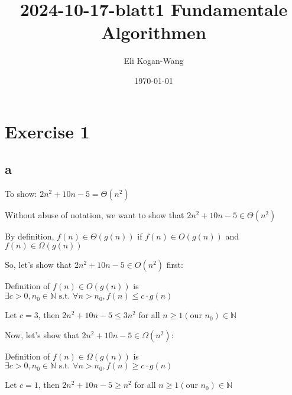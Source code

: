 \documentclass[a4paper,12pt]{article}
\title{2024-10-17-blatt1 Fundamentale Algorithmen}
\author{Eli Kogan-Wang}
\date{\today}
\begin{document}

\section{Exercise 1}

\subsection{a}

To show: $2n^2 + 10n - 5 = \Theta(n^2)$

Without abuse of notation, we want to show that $2n^2 + 10n - 5 \in \Theta(n^2)$

By definition, $f(n) \in \Theta(g(n))$ if $f(n) \in O(g(n))$ and $f(n) \in \Omega(g(n))$

So, let's show that $2n^2 + 10n - 5 \in O(n^2)$ first:

Definition of $f(n) \in O(g(n))$ is $\exists c > 0, n_0 \in \mathbb{N} \text{ s.t. } \forall n > n_0, f(n) \leq c \cdot g(n)$

Let $c = 3$, then $2n^2 + 10n - 5 \leq 3n^2$ for all $n \geq 1 (\text{our } n_0)\in \mathbb{N}$

Now, let's show that $2n^2 + 10n - 5 \in \Omega(n^2)$:

Definition of $f(n) \in \Omega(g(n))$ is $\exists c > 0, n_0 \in \mathbb{N} \text{ s.t. } \forall n > n_0, f(n) \geq c \cdot g(n)$

Let $c = 1$, then $2n^2 + 10n - 5 \geq n^2$ for all $n \geq 1 (\text{our } n_0)\in \mathbb{N}$
\end{document}
